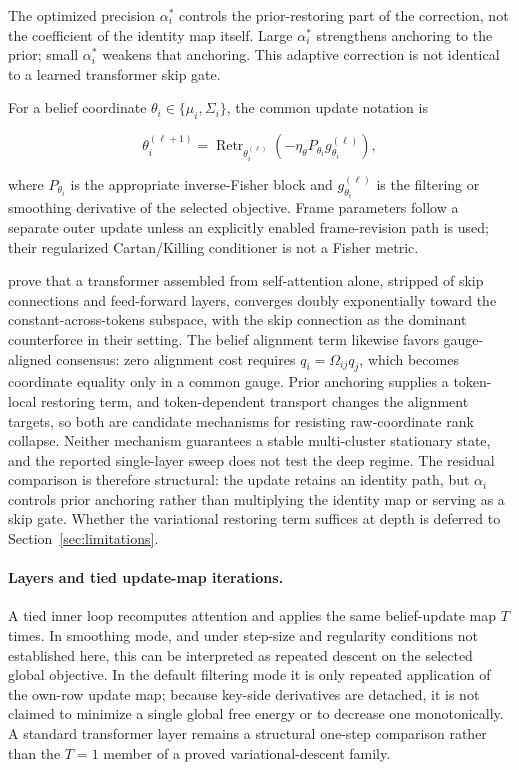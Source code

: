 \documentclass[twoside,11pt]{article}
\begin{document}
The optimized precision $\alpha_i^*$ controls the prior-restoring part of the correction, not the coefficient of the identity map itself. Large $\alpha_i^*$ strengthens anchoring to the prior; small $\alpha_i^*$ weakens that anchoring. This adaptive correction is not identical to a learned transformer skip gate.

For a belief coordinate $\theta_i\in\{\mu_i,\Sigma_i\}$, the common update notation is

\begin{equation}
\theta_i^{(\ell+1)}
=\operatorname{Retr}_{\theta_i^{(\ell)}}
\left(-\eta_\theta P_{\theta_i}g_{\theta_i}^{(\ell)}\right),
\end{equation}

where $P_{\theta_i}$ is the appropriate inverse-Fisher block and $g_{\theta_i}^{(\ell)}$ is the filtering or smoothing derivative of the selected objective. Frame parameters follow a separate outer update unless an explicitly enabled frame-revision path is used; their regularized Cartan/Killing conditioner is not a Fisher metric.

\citet{dong2021attention} prove that a transformer assembled from self-attention alone, stripped of skip connections and feed-forward layers, converges doubly exponentially toward the constant-across-tokens subspace, with the skip connection as the dominant counterforce in their setting. The belief alignment term likewise favors gauge-aligned consensus: zero alignment cost requires $q_i=\Omega_{ij}q_j$, which becomes coordinate equality only in a common gauge. Prior anchoring supplies a token-local restoring term, and token-dependent transport changes the alignment targets, so both are candidate mechanisms for resisting raw-coordinate rank collapse. Neither mechanism guarantees a stable multi-cluster stationary state, and the reported single-layer sweep does not test the deep regime. The residual comparison is therefore structural: the update retains an identity path, but $\alpha_i$ controls prior anchoring rather than multiplying the identity map or serving as a skip gate. Whether the variational restoring term suffices at depth is deferred to Section~\ref{sec:limitations}.

\paragraph{Layers and tied update-map iterations.}
A tied inner loop recomputes attention and applies the same belief-update map $T$ times. In smoothing mode, and under step-size and regularity conditions not established here, this can be interpreted as repeated descent on the selected global objective. In the default filtering mode it is only repeated application of the own-row update map; because key-side derivatives are detached, it is not claimed to minimize a single global free energy or to decrease one monotonically. A standard transformer layer remains a structural one-step comparison rather than the $T=1$ member of a proved variational-descent family.
\end{document}
